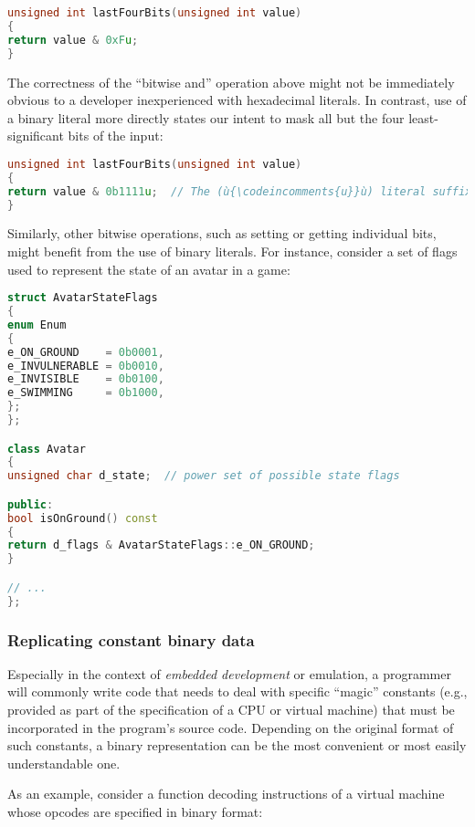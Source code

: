 \begin{lstlisting}[language=C++]
unsigned int lastFourBits(unsigned int value)
{
return value & 0xFu;
}
\end{lstlisting}


\noindent The correctness of the ``bitwise and'' operation above might not be
immediately obvious to a developer inexperienced with
hexadecimal literals. In contrast, use of a binary literal more directly
states our intent to mask all but the four least-significant bits of the
input:

\begin{lstlisting}[language=C++]
unsigned int lastFourBits(unsigned int value)
{
return value & 0b1111u;  // The (ù{\codeincomments{u}}ù) literal suffix here is entirely optional.
}
\end{lstlisting}


Similarly, other bitwise operations, such as setting or getting
individual bits, might benefit from the use of binary literals. For
instance, consider a set of flags used to represent the state of an
avatar in a game:

\begin{lstlisting}[language=C++]
struct AvatarStateFlags
{
enum Enum
{
e_ON_GROUND    = 0b0001,
e_INVULNERABLE = 0b0010,
e_INVISIBLE    = 0b0100,
e_SWIMMING     = 0b1000,
};
};

class Avatar
{
unsigned char d_state;  // power set of possible state flags

public:
bool isOnGround() const
{
return d_flags & AvatarStateFlags::e_ON_GROUND;
}

// ...
};
\end{lstlisting}


\subsubsection[Replicating constant binary data]{Replicating constant binary data}\label{replicating-constant-binary-data}

Especially in the context of \emph{embedded development} or emulation,
a programmer will commonly write code that needs to deal
with specific ``magic'' constants (e.g., provided as part of the
specification of a CPU or virtual machine) that must be incorporated in
the program's source code. Depending on the original format of such
constants, a binary representation can be the most convenient or most
easily understandable one.

As an example, consider a function decoding instructions of a virtual
machine whose opcodes are specified in binary format:

